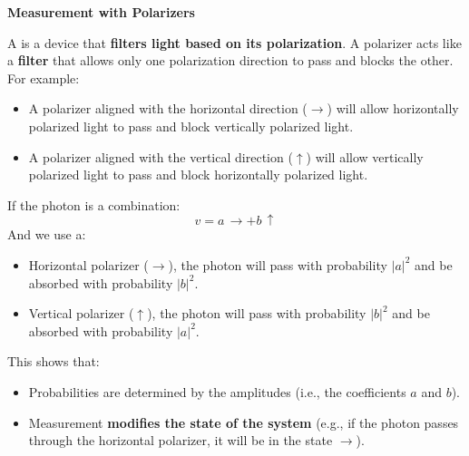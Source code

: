 \begin{examplebox}
    \begin{flushleft}
        \textcolor{Green3}{ \textbf{Measurement with Polarizers}}
    \end{flushleft}
    A  is a device that \textbf{filters light based on its polarization}. A polarizer acts like a \textbf{filter} that allows only one polarization direction to pass and blocks the other. For example:
    \begin{itemize}
        \item A polarizer aligned with the horizontal direction ($\rightarrow$) will allow horizontally polarized light to pass and block vertically polarized light.
        \item A polarizer aligned with the vertical direction ($\uparrow$) will allow vertically polarized light to pass and block horizontally polarized light.
    \end{itemize}
    If the photon is a combination:
    \begin{equation*}
        v = a\,\rightarrow + b\,\uparrow
    \end{equation*}
    And we use a:
    \begin{itemize}
        \item Horizontal polarizer ($\rightarrow$), the photon will pass with probability $|a|^2$ and be absorbed with probability $|b|^2$.
        \item Vertical polarizer ($\uparrow$), the photon will pass with probability $|b|^2$ and be absorbed with probability $|a|^2$.
    \end{itemize}
    This shows that:
    \begin{itemize}
        \item Probabilities are determined by the amplitudes (i.e., the coefficients $a$ and $b$).
        \item Measurement \textbf{modifies the state of the system} (e.g., if the photon passes through the horizontal polarizer, it will be in the state $\rightarrow$).
    \end{itemize}
\end{examplebox}